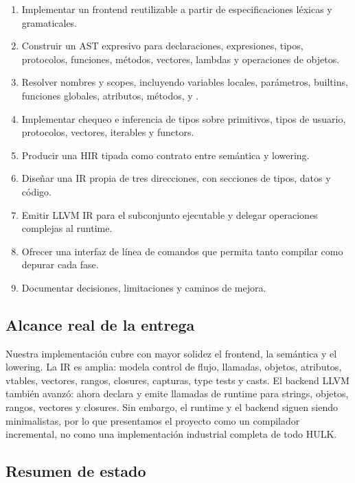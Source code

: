 \documentclass[12pt,letterpaper]{article}
\newcommand{\repo}[1]{\texttt{\detokenize{#1}}}
\newcommand{\hulk}{\textsc{HULK}}
\begin{document}
\begin{enumerate}[label=\arabic*.]
    \item Implementar un frontend reutilizable a partir de especificaciones léxicas y gramaticales.
    \item Construir un AST expresivo para declaraciones, expresiones, tipos, protocolos, funciones, métodos, vectores, lambdas y operaciones de objetos.
    \item Resolver nombres y scopes, incluyendo variables locales, parámetros, builtins, funciones globales, atributos, métodos, \repo{self} y \repo{base}.
    \item Implementar chequeo e inferencia de tipos sobre primitivos, tipos de usuario, protocolos, vectores, iterables y functors.
    \item Producir una HIR tipada como contrato entre semántica y lowering.
    \item Diseñar una IR propia de tres direcciones, con secciones de tipos, datos y código.
    \item Emitir LLVM IR para el subconjunto ejecutable y delegar operaciones complejas al runtime.
    \item Ofrecer una interfaz de línea de comandos que permita tanto compilar como depurar cada fase.
    \item Documentar decisiones, limitaciones y caminos de mejora.
\end{enumerate}

\subsection{Alcance real de la entrega}

Nuestra implementación cubre con mayor solidez el frontend, la semántica y el lowering. La IR es amplia: modela control de flujo, llamadas, objetos, atributos, vtables, vectores, rangos, closures, capturas, type tests y casts. El backend LLVM también avanzó: ahora declara y emite llamadas de runtime para strings, objetos, rangos, vectores y closures. Sin embargo, el runtime y el backend siguen siendo minimalistas, por lo que presentamos el proyecto como un compilador incremental, no como una implementación industrial completa de todo \hulk{}.

\subsection{Resumen de estado}
\end{document}
